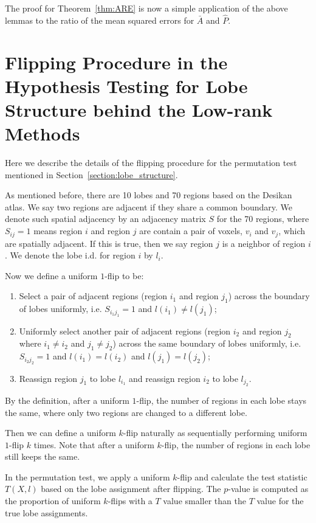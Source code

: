 \documentclass[10pt,letterpaper]{article}
\renewcommand{\hat}{\widehat}
\begin{document}
The proof for Theorem~\ref{thm:ARE} is now a simple application of the above lemmas to the ratio of the mean squared errors for $\bar{A}$ and $\hat{P}$.



\section{Flipping Procedure in the Hypothesis Testing for Lobe Structure behind the Low-rank Methods}
\label{section:testing}
% 
Here we describe the details of the flipping procedure for the permutation test mentioned in Section~\ref{section:lobe_structure}.

As mentioned before, there are 10 lobes and 70 regions based on the Desikan atlas. 
We say two regions are adjacent if they share a common boundary. We denote such spatial adjacency by an adjacency matrix $S$ for the 70 regions, where $S_{ij} = 1$ means region $i$ and region $j$ are contain a pair of voxels, $v_i$ and $v_j$, which are spatially adjacent.
If this is true, then we say region $j$ is a neighbor of region $i$.
We denote the lobe i.d. for region $i$ by $l_i$.

Now we define a uniform $1$-flip to be:
\begin{enumerate}
\item Select a pair of adjacent regions (region $i_1$ and region $j_1$) across the boundary of lobes uniformly, i.e. $S_{i_1 j_1} = 1$ and $l(i_1) \ne l(j_1)$;
\item Uniformly select another pair of adjacent regions (region $i_2$ and region $j_2$ where $i_1 \ne i_2$ and $j_1 \ne j_2$) across the same boundary of lobes uniformly, i.e. $S_{i_2 j_2} = 1$ and $l(i_1) = l(i_2)$ and $l(j_1) = l(j_2)$;
\item Reassign region $j_1$ to lobe $l_{i_1}$ and reassign region $i_2$ to lobe $l_{j_2}$.
\end{enumerate}

By the definition, after a uniform $1$-flip, the number of regions in each lobe stays the same, where only two regions are changed to a different lobe.

Then we can define a uniform $k$-flip naturally as sequentially performing uniform $1$-flip $k$ times.
Note that after a uniform $k$-flip, the number of regions in each lobe still keeps the same.

In the permutation test, we apply a uniform $k$-flip and calculate the test statistic $T(X, l)$ based on the lobe assignment after flipping.
The $p$-value is computed as the proportion of uniform $k$-flips with a $T$ value smaller than the $T$ value for the true lobe assignments.
\end{document}

